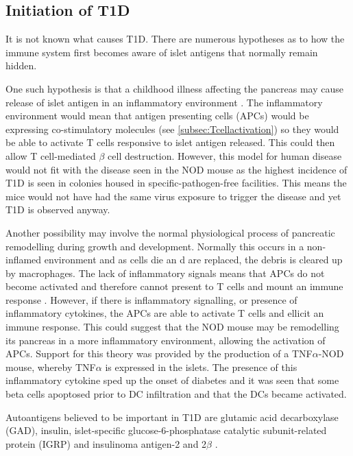 \subsection{Initiation of T1D}


It is not known what causes T1D.
There are numerous hypotheses as to how the immune system first becomes aware of islet antigens that normally remain hidden.

One such hypothesis is that a childhood illness affecting the pancreas may cause release of islet antigen in an inflammatory environment \citep{Green1999, Andreoletti1997}.
The inflammatory environment would mean that antigen presenting cells (APCs) would be expressing co-stimulatory molecules (see \cref{subsec:Tcellactivation}) so they would be able to activate T cells responsive to islet antigen released.
This could then allow T cell-mediated $\beta$ cell destruction.
However, this model for human disease would not fit with the disease seen in the NOD mouse as the highest incidence of T1D is seen in colonies housed in specific-pathogen-free facilities\citep{Delovitch1997}.
This means the mice would not have had the same virus exposure to trigger the disease and yet T1D is observed anyway.

Another possibility may involve the normal physiological process of pancreatic remodelling during growth and development.
Normally this occurs in a non-inflamed environment and as cells die an d are replaced, the debris is cleared up by macrophages.
The lack of inflammatory signals means that APCs do not become activated and therefore cannot present to T cells and mount an immune response \citep{Green1999}.
However, if there is inflammatory signalling, or presence of inflammatory cytokines, the APCs are able to activate T cells and ellicit an immune response.
This could suggest that the NOD mouse may be remodelling its pancreas in a more inflammatory environment, allowing the activation of APCs.
Support for this theory was provided by the production of a TNF$\alpha$-NOD mouse, whereby TNF$\alpha$ is expressed in the islets.
The presence of this inflammatory cytokine sped up the onset of diabetes and it was seen that some beta cells apoptosed prior to DC infiltration and that the DCs became activated\citep{Green1998}.

Autoantigens believed to be important in T1D are glutamic acid decarboxylase (GAD), insulin, islet-specific glucose-6-phosphatase catalytic subunit-related protein (IGRP) and insulinoma antigen-2 and 2$\beta$ \citep{Green1999, Roep2012}.


